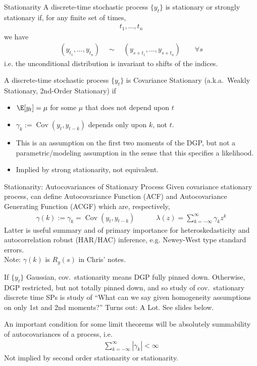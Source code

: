 \documentclass[aspectratio=169, handout]{beamer}
\newcommand{\Cov}{\operatorname{Cov}}
\begin{document}
{\footnotesize
\begin{frame}{Stationarity}
A discrete-time stochastic process $\{y_t\}$ is \alert{stationary} or
\alert{strongly stationary} if, for any finite set of times,
\begin{align*}
  t_1,\ldots,t_n
\end{align*}
we have
\begin{align*}
  (y_{t_1},\ldots,y_{t_n})
  \quad
  \sim
  \quad
  (y_{s+t_1},\ldots,y_{s+t_n})
  \qquad
  \forall s
\end{align*}
i.e. the unconditional distribution is \alert{invariant} to shifts of
the indices.

\pause
A discrete-time stochastic process $\{y_t\}$ is
\alert{Covariance Stationary}
(a.k.a.\ Weakly Stationary, 2nd-Order Stationary) if
\begin{itemize}
  \item $\E[y_t]=\mu$ for some $\mu$ that does not depend upon $t$
  \item $\gamma_k:=\Cov(y_t,y_{t-k})$ depends only upon $k$, not $t$.
  \pause
  \item This is an assumption on the first two moments of the
    \alert{DGP}, but not a \alert{parametric}/\alert{modeling}
    assumption in the sense that this specifies a likelihood.
  \item Implied by strong stationarity, not equivalent.
\end{itemize}
\end{frame}
}


{\scriptsize
\begin{frame}{Stationarity: Autocovariances of Stationary Process}
Given covariance stationary process, can define
\alert{Autocovariance Function} (ACF)
and \alert{Autocovariance Generating Function} (ACGF) which are,
respectively,
\begin{align*}
  \gamma(k)
  := \gamma_k
  = \Cov(y_t,y_{t-k})
  \qquad\quad
  \lambda(z)
  =
  \sum_{k=-\infty}^\infty \gamma_k z^k
\end{align*}
\pause
Latter is useful summary and of primary importance for
heteroskedasticity and autocorrelation robust (HAR/HAC) inference, e.g.
Newey-West type standard errors.
\\
Note: $\gamma(k)$ is $R_y(s)$ in Chris' notes.

\pause
If $\{y_t\}$ \alert{Gaussian}, cov.\ stationarity means DGP
fully pinned down.
Otherwise, DGP restricted, but not totally pinned down, and so study of
cov.\ stationary discrete time SPs is study of
``What can we say given homogeneity assumptions on only 1st and 2nd
moments?'' Turns out: A Lot. See slides below.

\pause
An important condition for some limit theorems will be absolutely
summability of autocovariances of a process, i.e.
\begin{align*}
  \sum_{k=-\infty}^\infty
  |\gamma_k|<\infty
\end{align*}
Not implied by second order stationarity or stationarity.
\end{frame}
}
\end{document}
